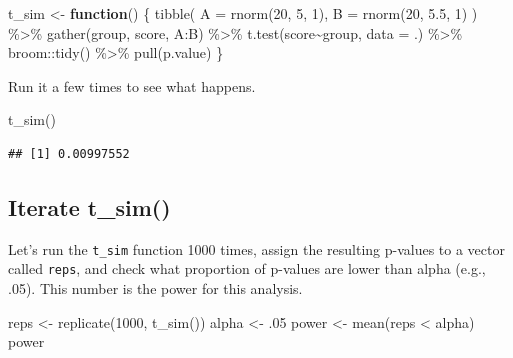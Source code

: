 \documentclass[
  oneside]{book}
\newenvironment{Shaded}{\begin{snugshade}}{\end{snugshade}}
\newcommand{\AttributeTok}[1]{\textcolor[rgb]{0.77,0.63,0.00}{#1}}
\newcommand{\ControlFlowTok}[1]{\textcolor[rgb]{0.13,0.29,0.53}{\textbf{#1}}}
\newcommand{\DecValTok}[1]{\textcolor[rgb]{0.00,0.00,0.81}{#1}}
\newcommand{\FloatTok}[1]{\textcolor[rgb]{0.00,0.00,0.81}{#1}}
\newcommand{\FunctionTok}[1]{\textcolor[rgb]{0.00,0.00,0.00}{#1}}
\newcommand{\NormalTok}[1]{#1}
\newcommand{\OtherTok}[1]{\textcolor[rgb]{0.56,0.35,0.01}{#1}}
\newcommand{\SpecialCharTok}[1]{\textcolor[rgb]{0.00,0.00,0.00}{#1}}
\begin{document}
\begin{Shaded}
\begin{Highlighting}[]
\NormalTok{t\_sim }\OtherTok{\textless{}{-}} \ControlFlowTok{function}\NormalTok{() \{}
  \FunctionTok{tibble}\NormalTok{(}
    \AttributeTok{A =} \FunctionTok{rnorm}\NormalTok{(}\DecValTok{20}\NormalTok{, }\DecValTok{5}\NormalTok{, }\DecValTok{1}\NormalTok{),}
    \AttributeTok{B =} \FunctionTok{rnorm}\NormalTok{(}\DecValTok{20}\NormalTok{, }\FloatTok{5.5}\NormalTok{, }\DecValTok{1}\NormalTok{)}
\NormalTok{  ) }\SpecialCharTok{\%\textgreater{}\%}
    \FunctionTok{gather}\NormalTok{(group, score, A}\SpecialCharTok{:}\NormalTok{B) }\SpecialCharTok{\%\textgreater{}\%}
    \FunctionTok{t.test}\NormalTok{(score}\SpecialCharTok{\textasciitilde{}}\NormalTok{group, }\AttributeTok{data =}\NormalTok{ .) }\SpecialCharTok{\%\textgreater{}\%}
\NormalTok{    broom}\SpecialCharTok{::}\FunctionTok{tidy}\NormalTok{() }\SpecialCharTok{\%\textgreater{}\%}
    \FunctionTok{pull}\NormalTok{(p.value) }
\NormalTok{\}}
\end{Highlighting}
\end{Shaded}

Run it a few times to see what happens.

\begin{Shaded}
\begin{Highlighting}[]
\FunctionTok{t\_sim}\NormalTok{()}
\end{Highlighting}
\end{Shaded}

\begin{verbatim}
## [1] 0.00997552
\end{verbatim}

\hypertarget{iterate-t_sim}{%
\subsection{Iterate t\_sim()}\label{iterate-t_sim}}

Let's run the \texttt{t\_sim} function 1000 times, assign the resulting p-values to a vector called \texttt{reps}, and check what proportion of p-values are lower than alpha (e.g., .05). This number is the power for this analysis.

\begin{Shaded}
\begin{Highlighting}[]
\NormalTok{reps }\OtherTok{\textless{}{-}} \FunctionTok{replicate}\NormalTok{(}\DecValTok{1000}\NormalTok{, }\FunctionTok{t\_sim}\NormalTok{())}
\NormalTok{alpha }\OtherTok{\textless{}{-}}\NormalTok{ .}\DecValTok{05}
\NormalTok{power }\OtherTok{\textless{}{-}} \FunctionTok{mean}\NormalTok{(reps }\SpecialCharTok{\textless{}}\NormalTok{ alpha)}
\NormalTok{power}
\end{Highlighting}
\end{Shaded}
\end{document}
